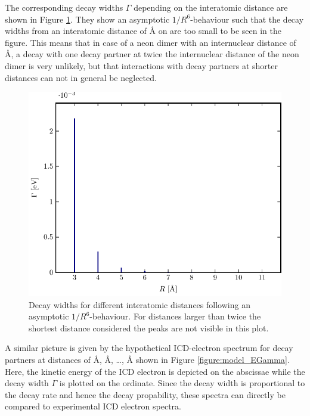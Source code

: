 The corresponding decay widths $\Gamma$ depending on the interatomic
distance are shown in Figure \ref{figure:model_RGamma}. They show an
asymptotic $1/R^6$-behaviour such that the decay widths from an interatomic
distance of \unit[7]{\AA} on are too small to be seen in the
figure. This means that in case of a neon dimer with an internuclear distance
of \unit[3]{\AA}, a decay with one decay partner at twice the internuclear
distance of the neon dimer is very unlikely, but that interactions with
decay partners at shorter distances can not in general be neglected.

\begin{figure}[h]
 \centering
 \includegraphics[width=\columnwidth]{pics/model_RGamma.pdf}
 \caption{Decay widths for different interatomic distances following an
          asymptotic $1/R^6$-behaviour. For distances larger than twice
          the shortest distance considered the peaks are not visible in this
          plot.}
 \label{figure:model_RGamma}
\end{figure}

A similar picture is given by the hypothetical ICD-electron spectrum for
decay partners at distances of \unit[3]{\AA}, \unit[4]{\AA}, \dots,
\unit[11]{\AA} shown in Figure \ref{figure:model_EGamma}. Here, the kinetic
energy of the ICD electron is depicted on the abscissae while the decay
width $\Gamma$ is plotted on the ordinate. Since the decay width is proportional
to the decay rate and hence the decay propability, these spectra can directly
be compared to experimental ICD electron spectra.

